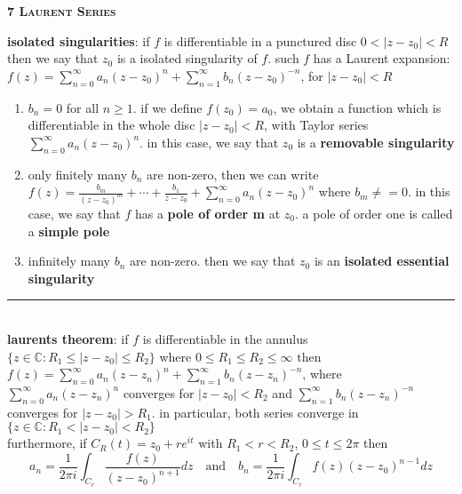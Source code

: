 \documentclass[a4paper]{article}
\newcommand*\abs[1]{\vert #1 \vert}
\newcommand*\linesep[0]{\noindent\rule{\textwidth}{0.5pt}\\}
\begin{document}
\begin{framed}
	\begin{center}
		\textbf{\textsc{7 Laurent Series}}
	\end{center}
	\textbf{isolated singularities}: if $f$ is differentiable in a punctured disc $0 < \abs{z - z_0} < R$ then we say that $z_0$ is a isolated singularity of $f$. such $f$ has a Laurent expansion: $f(z) = \sum_{n = 0}^\infty a_n(z - z_0)^n + \sum_{n = 1}^\infty b_n(z - z_0)^{-n}$, for $\abs{z - z_0} < R$
	
	\begin{enumerate}
		\item $b_n = 0$ for all $n \geq 1$. if we define $f(z_0) = a_0$, we obtain a function which is differentiable in the whole disc $\abs{z - z_0} < R$, with Taylor series $\sum_{n = 0}^\infty a_n (z - z_0)^n$. in this case, we say that $z_0$ is a \textbf{removable singularity}
		\item only finitely many $b_n$ are non-zero, then we can write $f(z) = \frac{b_m}{(z - z_0)^m} + \cdots + \frac{b_1}{z - z_0} + \sum_{n=0}^\infty a_n (z - z_0)^n$ where $b_m \neq = 0$. in this case, we say that $f$ has a \textbf{pole of order m} at $z_0$. a pole of order one is called a \textbf{simple pole}
		\item infinitely many $b_n$ are non-zero. then we say that $z_0$ is an \textbf{isolated essential singularity}
	\end{enumerate}
	
	\linesep
	
	\noindent
	\textbf{laurents theorem}: if $f$ is differentiable in the annulus $\{ z \in \mathbb{C} : R_1 \leq \abs{z - z_0} \leq R_2 \}$ where $0 \leq R_1 \leq R_2 \leq \infty$ then $f(z) = \sum_{n=0}^\infty a_n(z - z_n)^n + \sum_{n=1}^\infty b_n(z - z_n)^{-n}$, where $\sum_{n=0}^\infty a_n(z - z_n)^n$ converges for $\abs{z - z_0} < R_2$ and $\sum_{n=1}^\infty b_n(z - z_n)^{-n}$ converges for $\abs{z - z_0} > R_1$. in particular, both series converge in $\{ z \in \mathbb{C} : R_1 < \abs{z - z_0} < R_2 \}$\\
	
	\noindent
	furthermore, if $C_R(t) = z_0 + re^{it}$ with $R_1 < r < R_2$, $0 \leq t \leq 2\pi$ then $$a_n = \frac{1}{2\pi i} \int_{C_r} \frac{f(z)}{(z - z_0)^{n + 1}} dz \quad \text{and} \quad b_n = \frac{1}{2\pi i} \int_{C_r} f(z)(z - z_0)^{n - 1} dz$$
\end{framed}
\end{document}
